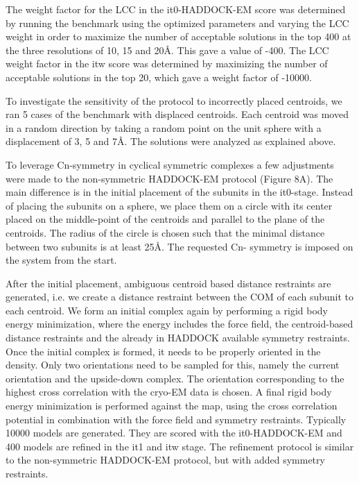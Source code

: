 The weight factor for the LCC in the it0-HADDOCK-EM score was determined by running the benchmark using the optimized parameters and varying the LCC weight in order to maximize the number of acceptable solutions in the top 400 at the three resolutions of 10, 15 and 20Å. This gave a value of -400. 
The LCC weight factor in the itw score was determined by maximizing the number of acceptable solutions in the top 20, which gave a weight factor of -10000.

To investigate the sensitivity of the protocol to incorrectly placed centroids, we ran 5 cases of the benchmark with displaced centroids. 
Each centroid was moved in a random direction by taking a random point on the unit sphere with a displacement of 3, 5 and 7Å. 
The solutions were analyzed as explained above.


To leverage Cn-symmetry in cyclical symmetric complexes a few adjustments were made to the non-symmetric HADDOCK-EM protocol (Figure 8A). 
The main difference is in the initial placement of the subunits in the it0-stage. 
Instead of placing the subunits on a sphere, we place them on a circle with its center placed on the middle-point of the centroids and parallel to the plane of the centroids. 
The radius of the circle is chosen such that the minimal distance between two subunits is at least 25Å. 
The requested Cn- symmetry is imposed on the system from the start. 

After the initial placement, ambiguous centroid based distance restraints are generated, i.e. we create a distance restraint between the COM of each subunit to each centroid. 
We form an initial complex again by performing a rigid body energy minimization, where the energy includes the force field, the centroid-based distance restraints and the already in HADDOCK available symmetry restraints. 
Once the initial complex is formed, it needs to be properly oriented in the density. 
Only two orientations need to be sampled for this, namely the current orientation and the upside-down complex. 
The orientation corresponding to the highest cross correlation with the cryo-EM data is chosen. 
A final rigid body energy minimization is performed against the map, using the cross correlation potential in combination with the force field and symmetry restraints. 
Typically 10000 models are generated. 
They are scored with the it0-HADDOCK-EM and 400 models are refined in the it1 and itw stage. 
The refinement protocol is similar to the non-symmetric HADDOCK-EM protocol, but with added symmetry restraints.

